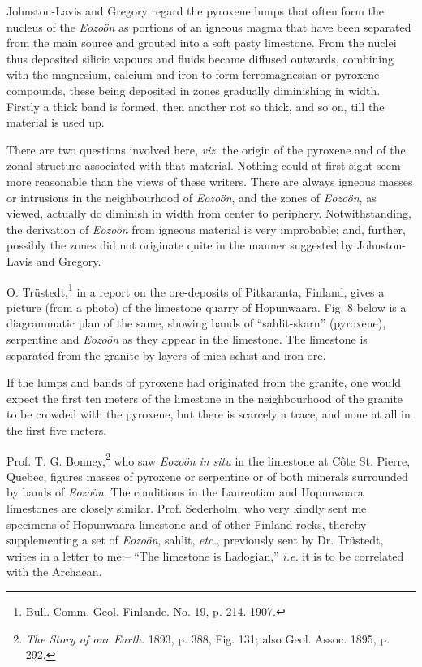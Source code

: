 \documentclass[a4paper, 12pt, oneside]{article}
\begin{document}
Johnston-Lavis and Gregory regard the pyroxene lumps that often form the nucleus of the \emph{Eozoön} as portions of an igneous magma that have been separated from the main source and grouted into a soft pasty limestone. From the nuclei thus deposited silicic vapours and fluids became diffused outwards, combining with the magnesium, calcium and iron to form ferromagnesian or pyroxene compounds, these being deposited in zones gradually diminishing in width. Firstly a thick band is formed, then another not so thick, and so on, till the material is used up.

There are two questions involved here, \emph{viz.} the origin of the pyroxene and of the zonal structure associated with that material. Nothing could at first sight seem more reasonable than the views of these writers. There are always igneous masses or intrusions in the neighbourhood of \emph{Eozoön}, and the zones of \emph{Eozoön}, as viewed, actually do diminish in width from center to periphery. Notwithstanding, the derivation of \emph{Eozoön} from igneous material is very improbable; and, further, possibly the zones did not originate quite in the manner suggested by Johnston-Lavis and Gregory.

O. Trüstedt,\footnote{Bull. Comm. Geol. Finlande. No. 19, p. 214. 1907.} in a report on the ore-deposits of Pitkaranta, Finland, gives a picture (from a photo) of the limestone quarry of Hopunwaara. Fig. 8 below is a diagrammatic plan of the same, showing bands of ``sahlit-skarn'' (pyroxene), serpentine and \emph{Eozoön} as they appear in the limestone. The limestone is separated from the granite by layers of mica-schist and iron-ore. 

If the lumps and bands of pyroxene had originated from the granite, one would expect the first ten meters of the limestone in the neighbourhood of the granite to be crowded with the pyroxene, but there is scarcely a trace, and none at all in the first five meters. 

Prof. T. G. Bonney,\footnote{\emph{The Story of our Earth}. 1893, p. 388, Fig. 131; also Geol. Assoc. 1895, p. 292.} who saw \emph{Eozoön} \emph{in situ} in the limestone at Côte St. Pierre, Quebec, figures masses of pyroxene or serpentine or of both minerals surrounded by bands of \emph{Eozoön}. The conditions in the Laurentian and Hopunwaara limestones are closely similar. Prof. Sederholm, who very kindly sent me specimens of Hopunwaara limestone and of other Finland rocks, thereby supplementing a set of \emph{Eozoön}, sahlit, \emph{etc.}, previously sent by Dr. Trüstedt, writes in a letter to me:-- ``The limestone is Ladogian,'' \emph{i.e.} it is to be correlated with the Archaean.
\end{document}
